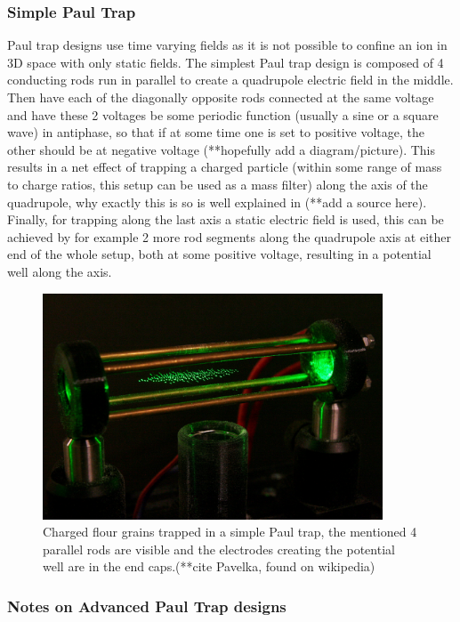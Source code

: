 \subsubsection{Simple Paul Trap}
Paul trap designs use time varying fields as it is not possible to confine an ion in 3D space with only static fields.
The simplest Paul trap design is composed of 4 conducting rods run in parallel to create a quadrupole electric field in the middle.
Then have each of the diagonally opposite rods connected at the same voltage and have these 2 voltages be some periodic function (usually a sine or a square wave) in antiphase, so that if at some time one is set to positive voltage, the other should be at negative voltage (**hopefully add a diagram/picture).
This results in a net effect of trapping a charged particle (within some range of mass to charge ratios, this setup can be used as a mass filter) along the axis of the quadrupole, why exactly this is so is well explained in (**add a source here).
Finally, for trapping along the last axis a static electric field is used, this can be achieved by for example 2 more rod segments along the quadrupole axis at either end of the whole setup, both at some positive voltage, resulting in a potential well along the axis.

\begin{figure}[h]
    \centering
    \includegraphics[width=0.9\textwidth]{images/ITQC_RFQ_Flour.jpg}
    \caption{Charged flour grains trapped in a simple Paul trap, the mentioned 4 parallel rods are visible and the electrodes creating the potential well are in the end caps.(**cite Pavelka, found on wikipedia)}\label{fig:ITQC_RFQ_Flour}
\end{figure}

\subsubsection{Notes on Advanced Paul Trap designs}



